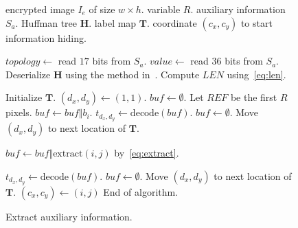 \documentclass[journal]{IEEEtran}
\begin{document}
	\begin{figure}[!t]
		\begin{algorithm}[H]
			\caption{Extract auxiliary information.}
			\label{algo:extractA}
			
			\begin{algorithmic}[1]
				\Require encrypted image \(I_e\) of size \(w \times h\).
				\Require variable \(R\).
				\Ensure auxiliary information \(S_a\).
				\Ensure Huffman tree \(\mathbf{H}\).
				\Ensure label map \(\mathbf{T}\).
				\Ensure coordinate \((c_x, c_y)\) to start information hiding.
				
				\State \(topology \gets\) read \(17\) bits from \(S_a\).
				\State \(value \gets\) read \(36\) bits from \(S_a\).
				\State Deserialize \(\mathbf{H}\) using the method in~\cite{Pu2006}.
				\State Compute \(LEN\) using~\eqref{eq:len}.
				
				\State Initialize \(\mathbf{T}\).
				\State \((d_x, d_y) \gets (1, 1)\).	
				\label{algo:extractT:idxProce}
				\State \(buf \gets \emptyset\).
				\State Let \(REF\) be the first \(R\) pixels.
				\label{algo:extractT:loop}
				\State	\(buf \gets buf \Vert b_i\).
				\State 		\(t_{d_x, d_y} \gets \mathrm{decode}(buf)\).		
				\label{algo:extractT:incdref} 
				\State 		\(buf \gets \emptyset\).
				\State		Move \((d_x, d_y)\) to next location of \(\mathbf{T}\).
				
				\EndIf
				\EndFor
				
				\label{algo:extractT:idxExt}
				\State 	\(buf \gets buf \Vert \mathrm{extract}(i, j)\) by~\eqref{eq:extract}. 
				\label{algo:extractT:nextij}
				
				\State 		\(t_{d_x, d_y} \gets \mathrm{decode}(buf)\). 
				\label{algo:extractT:nextd} 
				\State 		\(buf \gets \emptyset\).
				\State		Move \((d_x, d_y)\) to next location of \(\mathbf{T}\).
				\State			\((c_x, c_y) \gets (i, j)\)
				\State 			End of algorithm.
				\EndIf
				
				\EndIf
				\EndFor
			\end{algorithmic}
		\end{algorithm}
	\end{figure}
\end{document}
